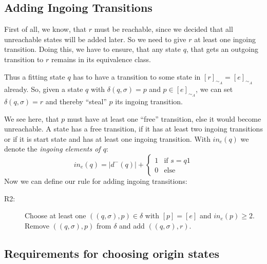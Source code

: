 \subsection{Adding Ingoing Transitions}

First of all, we know, that $r$ must be reachable, since we decided that all unreachable states will be added later. So we need to give $r$ at least one ingoing transition. Doing this, we have to ensure, that any state $q$, that gets an outgoing transition to $r$ remains in its equivalence class.

Thus a fitting state $q$ has to have a transition to some state in $[r]_{\sim_A} = [e]_{\sim_A}$ already. So, given a state $q$ with $\delta(q, \sigma) = p$ and $p \in [e]_{\sim_A}$, we can set $\delta(q, \sigma) = r$ and thereby ``steal'' $p$ its ingoing transition.

We see here, that $p$ must have at least one ``free'' transition, else it would become unreachable. A state has a free transition, if it has at least two ingoing transitions or if it is start state and has at least one ingoing transition. With $in_e(q)$ we denote the \emph{ingoing elements of $q$}:
\[
	in_e(q) = |d^-(q)| + \begin{cases}
							1 & \text{if } s = q1\\
							0 & \text{else}
						 \end{cases}
\]
Now we can define our rule for adding ingoing transitions:
\begin{description}
	\item[R2:] Choose at least one $((q, \sigma), p) \in \delta$ with $[p] = [e]$ and $in_e(p) \ge 2$. Remove $((q, \sigma), p)$ from $\delta$ and add $((q, \sigma), r)$.
\end{description}

\subsection{Requirements for choosing origin states}

